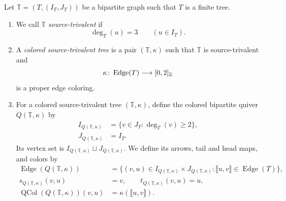 \begin{definition}\label{def:source-trivalent-tree}
Let $\mathbb T=(T,(I_T,J_T))$ be a bipartite graph such that $T$ is a finite tree.
\begin{enumerate}[font=\itshape]
\item We call $\mathbb T$ \textit{source-trivalent} if
\[
 \deg_T(u)=3\qquad(u\in I_T).
\]
\item A \textit{colored source-trivalent tree} is a pair $(\mathbb T,\kappa)$ such that $\mathbb T$ is source-trivalent and
\[
 \kappa\colon\operatorname{Edge}(T)\longrightarrow[0,2]_{\mathbb Z}
\]
is a proper edge coloring.
\item\label{d:reflected-quiver} For a colored source-trivalent tree $(\mathbb T,\kappa)$, define the colored bipartite quiver $Q(\mathbb T,\kappa)$ by
\[
\begin{aligned}
 I_{Q(\mathbb T,\kappa)}
 &=\{v\in J_{T}:\deg_T(v)\ge2\},\\
 J_{Q(\mathbb T,\kappa)}&=I_{T}.
\end{aligned}
\]
Its vertex set is $I_{Q(\mathbb T,\kappa)}\sqcup J_{Q(\mathbb T,\kappa)}$.
We define its arrows, tail and head maps, and colors by
\[
\begin{aligned}
 \operatorname{Edge}(Q(\mathbb T,\kappa))
 &=\{(v,u)\in I_{Q(\mathbb T,\kappa)}\times J_{Q(\mathbb T,\kappa)}:
 \llbracket u,v\rrbracket\in\operatorname{Edge}(T)\},\\
 s_{Q(\mathbb T,\kappa)}(v,u)&=v,\qquad t_{Q(\mathbb T,\kappa)}(v,u)=u,\\
 \operatorname{QCol}(Q(\mathbb T,\kappa))(v,u)&=\kappa(\llbracket u,v\rrbracket).
\end{aligned}
\]
\end{enumerate}
\end{definition}

